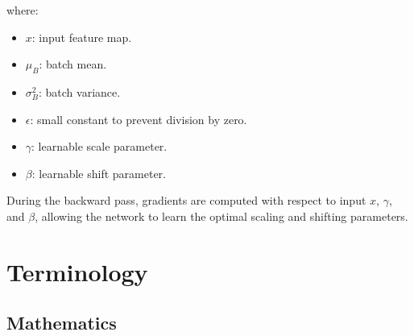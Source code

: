 \documentclass[a4paper]{report}
\begin{document}
where:
\begin{itemize}
    \item $x$: input feature map.
    \item $\mu_B$: batch mean.
    \item $\sigma_B^2$: batch variance.
    \item $\epsilon$: small constant to prevent division by zero.
    \item $\gamma$: learnable scale parameter.
    \item $\beta$: learnable shift parameter.
\end{itemize}

During the backward pass, gradients are computed with respect to input $x$, $\gamma$, and $\beta$, allowing the network to learn the optimal scaling and shifting parameters.




\chapter{Terminology}



\section{Mathematics}
\end{document}
